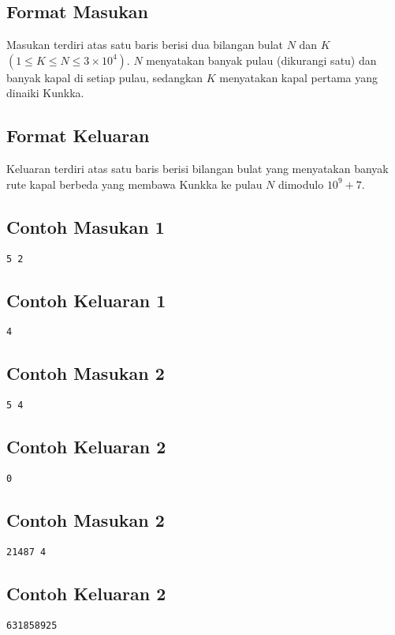 \documentclass{article}
\begin{document}
\subsection*{Format Masukan}
Masukan terdiri atas satu baris berisi dua bilangan bulat $N$ dan $K$ $(1 \leq K \leq N \leq 3 \times 10^4)$. $N$ menyatakan banyak pulau (dikurangi satu) dan banyak kapal di setiap pulau, sedangkan $K$ menyatakan kapal pertama yang dinaiki Kunkka.

\subsection*{Format Keluaran}
Keluaran terdiri atas satu baris berisi bilangan bulat yang menyatakan banyak rute kapal berbeda yang membawa Kunkka ke pulau $N$ dimodulo $10^9+7$.

\begin{multicols}{2}
\subsection*{Contoh Masukan 1}
\begin{lstlisting}
5 2
\end{lstlisting}
\null
\columnbreak
\subsection*{Contoh Keluaran 1}
\begin{lstlisting}
4
\end{lstlisting}
\vfill
\null
\end{multicols}

\begin{multicols}{2}
\subsection*{Contoh Masukan 2}
\begin{lstlisting}
5 4
\end{lstlisting}
\null
\columnbreak
\subsection*{Contoh Keluaran 2}
\begin{lstlisting}
0
\end{lstlisting}
\vfill
\null
\end{multicols}

\begin{multicols}{2}
\subsection*{Contoh Masukan 2}
\begin{lstlisting}
21487 4
\end{lstlisting}
\null
\columnbreak
\subsection*{Contoh Keluaran 2}
\begin{lstlisting}
631858925
\end{lstlisting}
\vfill
\null
\end{multicols}
\end{document}
